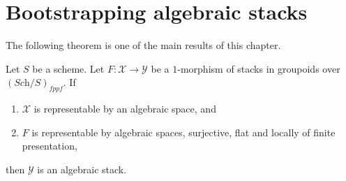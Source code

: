 \section{Bootstrapping algebraic stacks}
\label{section-bootstrap}

\noindent
The following theorem is one of the main results of this chapter.

\begin{theorem}
\label{theorem-bootstrap}
Let $S$ be a scheme. Let $F : \mathcal{X} \to \mathcal{Y}$
be a $1$-morphism of stacks in groupoids over $(\textit{Sch}/S)_{fppf}$. If
\begin{enumerate}
\item $\mathcal{X}$ is representable by an algebraic space, and
\item $F$ is representable by algebraic spaces, surjective, flat and
locally of finite presentation,
\end{enumerate}
then $\mathcal{Y}$ is an algebraic stack.
\end{theorem}

